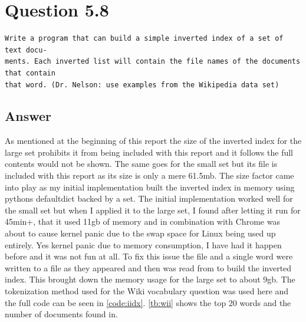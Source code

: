 \documentclass[11pt]{article}
\begin{document}
\section{Question 5.8}
\begin{verbatim}
Write a program that can build a simple inverted index of a set of text docu-
ments. Each inverted list will contain the file names of the documents that contain
that word. (Dr. Nelson: use examples from the Wikipedia data set) 
\end{verbatim}
\subsection{Answer}
As mentioned at the beginning of this report the size of the inverted index for the large set prohibits it from being included with this report and it follows the full contents would not be shown. The same goes for the small set but its file is included with this report as its size is only a mere 61.5mb. The size factor came into play as my initial implementation built the inverted index in memory using pythons defaultdict backed by a set. The initial implementation worked well for the small set but when I applied it to the large set, I found after letting it run for 45min+, that it used 11gb of memory and in combination with Chrome was about to cause kernel panic due to the swap space for Linux being used up entirely. Yes kernel panic due to memory consumption, I have had it happen before and it was not fun at all. To fix this issue the file and a single word were written to a file as they appeared and then was read from to build the inverted index. This brought down the memory usage for the large set to about 9gb. The tokenization method used for the  Wiki vocabulary question was used here and the full code can be seen in \autoref{code:iidx}.
\autoref{tb:wii} shows the top 20 words and the number of documents found in.
\end{document}

